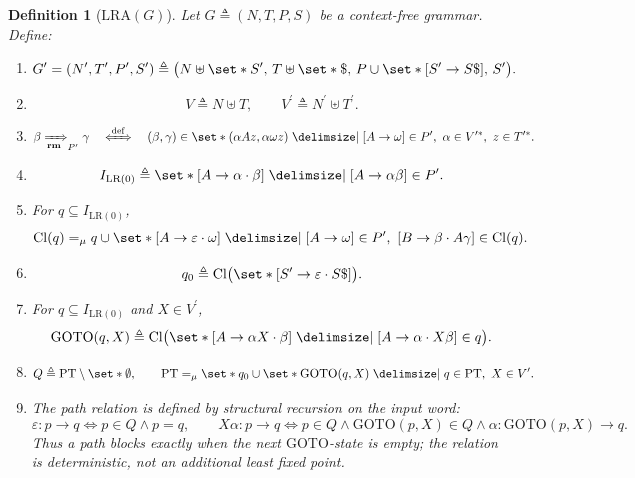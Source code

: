 \documentclass[11pt,a4paper]{article}
\theoremstyle{prettyplain}
\theoremstyle{prettydef}
\newtheorem{definition}[theorem]{Definition}
\def\mid{\;\delimsize\vert\;}#1%
\newcommand{\eps}{\varepsilon}
\newcommand{\LRA}{\mathrm{LRA}}
\newcommand{\LRzero}{\mathrm{LR(0)}}
\newcommand{\RMP}{\xRightarrow[\mathbf{rm}]{}_{P^\prime}}
\newcommand{\Path}[3]{#1:#2\to#3}
\newcommand{\Item}[2]{[#1\to #2]}
\begin{document}
\begin{definition}[$\LRA(G)$]\label{def:lra}
Let \(G \triangleq (N,T,P,S)\) be a context-free grammar.  Define:
\begin{enumerate}[label=\textup{(\roman*)}]
\item
\[
G^\prime=(N^\prime,T^\prime,P^\prime,S^\prime)
\triangleq
\bigl(N\uplus\set*{S^\prime},\,
      T\uplus\set*{\$},\,
      P\cup\set*{\Item{S^\prime}{S\$}},\,
      S^\prime\bigr).
\]

\item
\[
V\triangleq N\uplus T,\qquad
V^\prime\triangleq N^\prime\uplus T^\prime .
\]

\item
\[
\beta\RMP\gamma
\quad\xLeftrightarrow{\mathrm{def}}\quad
(\beta,\gamma)\in
\set*{(\alpha A z,\alpha\omega z)
\mid
\Item{A}{\omega}\in P^\prime,\ \alpha\in V^{\prime *},\ z\in T^{\prime *}}.
\]

\item
\[
I_{\LRzero}
\triangleq
\set*{\Item{A}{\alpha\cdot\beta}
\mid
\Item{A}{\alpha\beta}\in P^\prime}.
\]

\item For \(q\subseteq I_{\LRzero}\),
\[
\mathrm{Cl}(q)
=_\mu
q\cup
\set*{\Item{A}{\eps\cdot\omega}
\mid
\Item{A}{\omega}\in P^\prime,\
\Item{B}{\beta\cdot A\gamma}\in \mathrm{Cl}(q)}.
\]

\item
\[
q_0\triangleq
\mathrm{Cl}\bigl(\set*{\Item{S^\prime}{\eps\cdot S\$}}\bigr).
\]

\item For \(q\subseteq I_{\LRzero}\) and \(X\in V^\prime\),
\[
\mathrm{GOTO}(q,X)
\triangleq
\mathrm{Cl}\bigl(
\set*{\Item{A}{\alpha X\cdot\beta}
\mid
\Item{A}{\alpha\cdot X\beta}\in q}
\bigr).
\]

\item
\[
Q\triangleq \mathrm{PT}\setminus\set*{\emptyset},
\qquad
\mathrm{PT}
=_\mu
\set*{q_0}
\cup
\set*{\mathrm{GOTO}(q,X)\mid q\in\mathrm{PT},\ X\in V^\prime}.
\]

\item The path relation is defined by structural recursion on the input word:
\[
\Path{\eps}{p}{q} \Longleftrightarrow p\in Q\land p=q,
\qquad
\Path{X\alpha}{p}{q}
\Longleftrightarrow
p\in Q\land \mathrm{GOTO}(p,X)\in Q
\land \Path{\alpha}{\mathrm{GOTO}(p,X)}{q} .
\]
Thus a path blocks exactly when the next \(\mathrm{GOTO}\)-state is empty; the
relation is deterministic, not an additional least fixed point.


\end{enumerate}
\end{definition}
\end{document}
